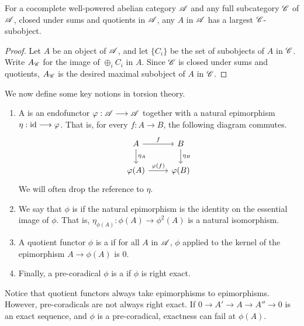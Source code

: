 \begin{prop}\label{prop_max_subobj}
For a cocomplete well-powered abelian category $\mathscr{A}$ and
any full subcategory $\mathscr{C}$ of $\mathscr{A}$, closed under sums 
and quotients in $\mathscr{A}$, any $A$ in $\mathscr{A}$ has a largest 
$\mathscr{C}$-subobject.
\end{prop}
\begin{proof}
Let $A$ be an object of $\mathscr{A}$, and let $\{C_i\}$ be the set 
of subobjects of $A$ in $\mathscr{C}$. Write $A_{\mathscr{C}}$ for the
image of $\oplus_{i} C_i$ in $A$. Since $\mathscr{C}$ is closed under
sums and quotients, $A_{\mathscr{C}}$ is the desired maximal subobject 
of $A$ in $\mathscr{C}$.
\end{proof}

We now define some key notions in torsion theory.

\begin{defn}\label{def_coradical}
\begin{enumerate}
\item A  is an endofunctor $\varphi : \mathscr{A} 
\longrightarrow \mathscr{A}$ together with a natural epimorphism $\eta: \mathrm{id} \longrightarrow 
\varphi$. That is, for every $f: A \to B$, the following diagram commutes.
\[
\begin{tikzcd}
A \arrow{r}{f} \arrow{d}{\eta_A} &
B \arrow{d}{\eta_B} \\
\phi(A) \arrow{r}{\phi(f)} 
&\phi(B)
\end{tikzcd}
\]
We will often drop the reference to $\eta$. 

\item We say that $\phi$ is  if the natural 
epimorphism is the identity on the essential image of $\phi$.
That is, $\eta_{\phi(A)}: \phi(A) \to \phi^2(A)$ is a natural 
isomorphism.

\item A quotient functor $\phi$ is a  if for all
$A$ in $\mathscr{A}$, $\phi$ applied to the kernel of the epimorphism 
$A \to \phi(A)$ is $0$.

\item Finally, a pre-coradical $\phi$ is a  if $\phi$ is
right exact.
\end{enumerate}
\end{defn}

\begin{rmk}
Notice that quotient functors always take epimorphisms to 
epimorphisms. However, pre-coradicals are not always right exact.
If $0 \to A' \to A \to A'' \to 0$ is an exact sequence, and $\phi$
is a pre-coradical, exactness can fail at $\phi(A)$.
\end{rmk}

